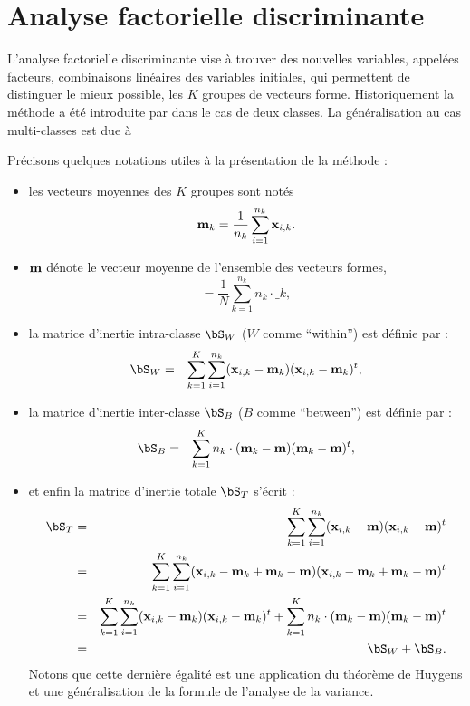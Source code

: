 \section{Analyse factorielle discriminante}
L'analyse factorielle discriminante vise \`a trouver des nouvelles
variables, appel\'ees facteurs, combinaisons lin\'eaires des 
variables initiales, 
qui permettent de distinguer le mieux possible, les 
$K$ groupes de vecteurs forme. Historiquement la m\'ethode
a \'et\'e introduite par  dans le cas de deux
classes. La g\'en\'eralisation au cas multi-classes est due 
\`a 

Pr\'ecisons quelques notations utiles \`a  la pr\'esentation
de la m\'ethode :
\begin{itemize}
\item
les vecteurs moyennes des $K$ groupes sont not\'es
$$
\mbox{\bf m}_k=\frac{1}{n_k}\sum_{i=1}^{n_k} \mbox{\bf x}_{i,k}.
$$
\item
$\mbox{\bf m}$ d\'enote le vecteur moyenne de l'ensemble des vecteurs formes, 
$$
\bm= \frac{1}{N}\sum_{k=1}^{n_k} n_k \cdot \bm_k,
$$
\item
la matrice d'inertie intra-classe $\bS_W$ ($W$ comme ``within'') 
est d\'efinie par :
\begin{eqnarray*}
\bS_W &=&  \sum_{k=1}^K \sum_{i=1}^{n_k} (\x_{i,k}-\bm_k)(\x_{i,k}-\bm_k)^t,
\end{eqnarray*}
\item
la matrice d'inertie inter-classe $\bS_B$ ($B$ comme ``between'') est 
d\'efinie par :
\begin{eqnarray*}
\bS_B & = & \sum_{k=1}^K n_k \cdot (\bm_k - \bm)(\bm_k - \bm)^t ,
\end{eqnarray*}
\item
et enfin la matrice d'inertie totale $\bS_T$ s'\'ecrit :
\begin{eqnarray*}
\bS_T &=& \sum_{k=1}^K \sum_{i=1}^{n_k} (\x_{i,k}-\bm) (\x_{i,k}-\bm)^t \\
    &=& \sum_{k=1}^K \sum_{i=1}^{n_k} (\x_{i,k}-\bm_k+\bm_k-\bm)(\x_{i,k}-\bm_k+\bm_k-\bm)^t\\
    &=&     \sum_{k=1}^K \sum_{i=1}^{n_k} (\x_{i,k}-\bm_k)(\x_{i,k}-\bm_k)^t +
           \sum_{k=1}^K n_k \cdot (\bm_k - \bm)(\bm_k - \bm)^t\\
   &=& \bS_W + \bS_B.
\end{eqnarray*}
Notons que cette derni\`ere \'egalit\'e est une application du th\'eor\`eme de
Huygens et  une g\'en\'eralisation de la formule de l'analyse de la variance.
\end{itemize}


